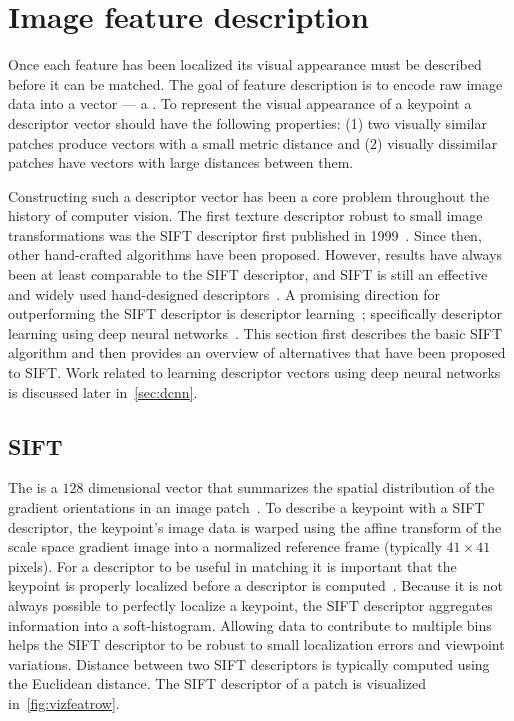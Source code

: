 \section{Image feature description}\label{sec:featuredescribe}  

    Once each feature has been localized its visual appearance must be described before it can be matched. The goal
    of feature description is to encode raw image data into a vector --- \ie{} a . To
    represent the visual appearance of a keypoint a descriptor vector should have the following properties: (1) two
    visually similar patches produce vectors with a small metric distance and (2) visually dissimilar patches have
    vectors with large distances between them.

    Constructing such a descriptor vector has been a core problem throughout the history of computer vision. The
    first texture descriptor robust to small image transformations was the SIFT descriptor first published in
    1999~\cite{lowe_object_1999, lowe_distinctive_2004}. Since then, other hand-crafted algorithms have been
    proposed. However, results have always been at least comparable to the SIFT descriptor, and SIFT is still an
    effective and widely used hand-designed descriptors~\cite{mikolajczyk_performance_2005, calonder_brief_2010,
    bay_surf_2006, leutenegger_brisk_2011, alahi_freak_2012, jegou_triangulation_2014}. A promising direction for
    outperforming the SIFT descriptor is descriptor learning~\cite{simonyan_descriptor_2012,
    simonyan_learning_2014, winder_picking_2009}; specifically descriptor learning using deep neural
    networks~\cite{razavian_cnn_2014, bengio_representation_2013, russakovsky_imagenet_2014}. This section first
    describes the basic SIFT algorithm and then provides an overview of alternatives that have been proposed to
    SIFT{}. Work related to learning descriptor vectors using deep neural networks is discussed later
    in~\cref{sec:dcnn}.
      
    \subsection{SIFT}
        The  is a $128$ dimensional vector that summarizes the spatial distribution of
        the gradient orientations in an image patch~\cite{lowe_distinctive_2004}. To describe a keypoint with a
        SIFT descriptor, the keypoint's image data is warped using the affine transform of the scale space gradient
        image into a normalized reference frame (typically $41 \times 41$ pixels). For a descriptor to be useful in
        matching it is important that the keypoint is properly localized before a descriptor is
        computed~\cite{ke_pca_sift_2004}. Because it is not always possible to perfectly localize a keypoint, the
        SIFT descriptor aggregates information into a soft-histogram. Allowing data to contribute to multiple bins
        helps the SIFT descriptor to be robust to small localization errors and viewpoint variations. Distance
        between two SIFT descriptors is typically computed using the Euclidean distance. The SIFT descriptor of a
        patch is visualized in~\cref{fig:vizfeatrow}.

